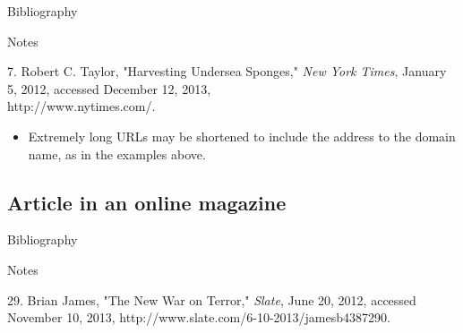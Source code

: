 \begin{center}{Bibliography}\end{center}

\begin{singlespace}
\noindent{}
\end{singlespace}

\begin{center}{Notes}\end{center}

\begin{singlespace}
\noindent\hspace{1.2cm}7. Robert C. Taylor, "Harvesting Undersea Sponges,"
\emph{New York Times}, January 5, 2012, accessed December 12, 2013,\\
http://www.nytimes.com/.
\end{singlespace}

\begin{itemize}\item Extremely long URLs may be shortened to include the address
to the domain name, as in the examples above.\end{itemize}

\subsection{Article in an online magazine}

\begin{center}{Bibliography}\end{center}

\begin{singlespace}
\noindent{}
\end{singlespace}

\begin{center}{Notes}\end{center}

\begin{singlespace}
\noindent\hspace{1.2cm}29. Brian James, "The New War on Terror," \emph{Slate},
June 20, 2012, accessed November 10, 2013,
http://www.slate.com/6-10-2013/jamesb4387290.
\end{singlespace}

